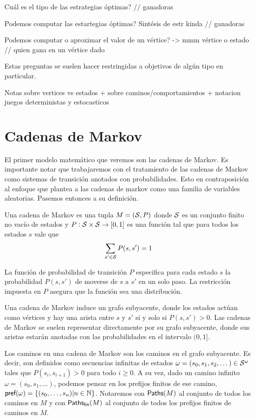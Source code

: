 Cuál es el tipo de las estrategias óptimas? // ganadoras

Podemos computar las estartegias óptimas? Sintésis de estr kinda // ganadoras

Podemos computar o aproximar el valor de un vértice? -> mmm vértice o estado //
quien gana en un vértice dado

Estas preguntas se suelen hacer restringidas a objetivos de algún tipo en
particular.

Notas sobre vertices vs estados + sobre caminos/comportamientos + notacion
juegos deterministas y estocasticos

\section{Cadenas de Markov}

El primer modelo matemático que veremos son las cadenas de Markov. Es
importante notar que trabajaremos con el tratamiento de las cadenas de Markov
como sistemas de transición anotados con probabilidades. Esto en contraposición
al enfoque que plantea a las cadenas de markov como una familia de variables
aleatorias. Pasemos entonces a su definición.

\begin{definition}
	Una cadena de Markov es una tupla $M = (\mathcal{S}, P)$ donde $\mathcal{S}$ es un conjunto finito no vacío de estados y $P: \mathcal{S} \times \mathcal{S} \rightarrow [0,1]$ es una función tal que para todos los estados $s$ vale que
	$$ \sum_{s' \in \mathcal{S}} P(s, s') = 1$$
\end{definition}

La función de probabilidad de transición $P$ especifica para cada estado $s$ la
probabilidad $P(s, s')$ de moverse de $s$ a $s'$ en un solo paso. La
restricción impuesta en $P$ asegura que la función sea una distribución.

Una cadena de Markov induce un grafo subyacente, donde los estados actúan como
vértices y hay una arista entre $s$ y $s'$ si y solo si $P(s, s') > 0$. Las
cadenas de Markov se suelen representar directamente por su grafo subyacente,
donde sus aristas estarán anotadas con las probabilidades en el intervalo $(0,
	1]$.

Los caminos en una cadena de Markov son los caminos en el grafo subyacente. Es
decir, son definidos como secuencias infinitas de estados $\omega = (s_0, s_1,
	s_2, \dots) \in \mathcal{S}^\omega$ tales que $P(s_i, s_{i+1}) > 0 $ para todo $i \geq
	0$. A su vez, dado un camino infinito $\omega = (s_0, s_1, \dots)$, podemos
pensar en los prefijos finitos de ese camino, $\textsf{pref}(\omega) = \{(s_0,
	\dots, s_n) | n \in \mathbb{N}\}$. Notaremos con $\textsf{Paths}(M)$ al conjunto de
todos los caminos en $M$ y con $\textsf{Paths}_\textsf{fin}(M)$ al conjunto de todos los prefijos
finitos de caminos en $M$.

